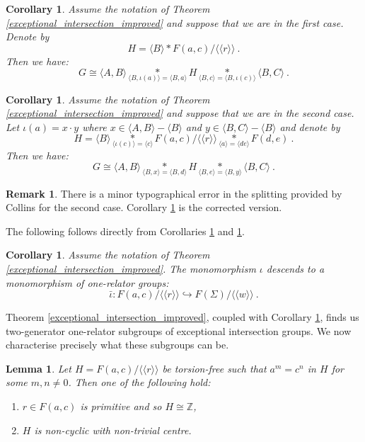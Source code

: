 \documentclass[11pt, a4paper]{amsart}
\newtheorem{lemma}[theorem]{Lemma}
\newtheorem{corollary}[theorem]{Corollary}
\theoremstyle{definition}
\newtheorem{remark}[theorem]{Remark}
\newcommand{\isom}{\cong}
\newcommand{\Z}{\mathbb{Z}}
\newcommand{\normal}[1]{\langle\langle #1 \rangle\rangle}
\def\injects{\hookrightarrow}
\begin{document}
\begin{corollary}
\label{exceptional_splitting}
Assume the notation of Theorem \ref{exceptional_intersection_improved} and suppose that we are in the first case. Denote by
\[
H = \langle B\rangle*F(a, c)/\normal{r}~.
\]
Then we have:
\[
G \isom \langle A, B\rangle \underset{\langle B, \iota(a)\rangle = \langle B, a\rangle}{*} H \underset{\langle B, c\rangle = \langle B, \iota(c)\rangle}{*} \langle B, C\rangle~.
\]
\end{corollary}


\begin{corollary}
\label{exceptional_splitting_2}
Assume the notation of Theorem \ref{exceptional_intersection_improved} and suppose that we are in the second case. Let $\iota(a) = x\cdot y$ where $x\in \langle A, B\rangle - \langle B\rangle$ and $y \in \langle B, C\rangle - \langle B\rangle$ and denote by
\[
H = \langle B\rangle\underset{\langle \iota(c)\rangle = \langle c\rangle}{*}F(a, c)/\normal{r} \underset{\langle a\rangle = \langle de\rangle}{*} F(d, e)~.
\]
Then we have:
\[
G \isom \langle A, B\rangle\underset{\langle B, x\rangle = \langle B, d\rangle}{*} H \underset{\langle B, e\rangle = \langle B, y\rangle}{*} \langle B, C\rangle~.
\]
\end{corollary}

\begin{remark}
There is a minor typographical error in the splitting provided by Collins for the second case. Corollary \ref{exceptional_splitting_2} is the corrected version.
\end{remark}

The following follows directly from Corollaries \ref{exceptional_splitting} and \ref{exceptional_splitting_2}.

\begin{corollary}
\label{induced_injective}
Assume the notation of Theorem \ref{exceptional_intersection_improved}. The monomorphism $\iota$ descends to a monomorphism of one-relator groups:
\[
\bar{\iota}:F(a, c)/\normal{r}\injects F(\Sigma)/\normal{w}~.
\]
\end{corollary}


Theorem \ref{exceptional_intersection_improved}, coupled with Corollary \ref{induced_injective}, finds us two-generator one-relator subgroups of exceptional intersection groups. We now characterise precisely what these subgroups can be.

\begin{lemma}
\label{first_exceptional_intersection}
Let $H = F(a, c)/\normal{r}$ be torsion-free such that $a^m = c^n$ in $H$ for some $m, n\neq 0$. Then one of the following hold:
\begin{enumerate}
\item $r\in F(a, c)$ is primitive and so $H\isom \Z$,
\item $H$ is non-cyclic with non-trivial centre.
\end{enumerate}
\end{lemma}
\end{document}
